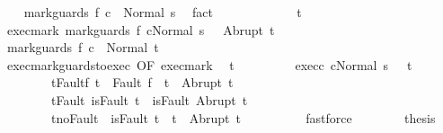 \begin{isabellebody}
\ \ \isamarkupfalse%
\ {\isachardoublequoteopen}{\isasymGamma}{\isasymturnstile}mark{\isacharunderscore}guards\ f\ c{}\ {\isasymdown}\ Normal\ s{\isachardoublequoteclose}\ \isamarkupfalse%
\ fact\isanewline
\ \ \isamarkupfalse%
\ \isanewline
\ \ \isacommand{{\isacharbraceleft}}\isamarkupfalse%
\isanewline
\ \ \ \ \isamarkupfalse%
\ t\isanewline
\ \ \ \ \isamarkupfalse%
\ exec{\isacharunderscore}mark{\isacharcolon}\ {\isachardoublequoteopen}{\isasymGamma}{\isasymturnstile}{\isasymlangle}mark{\isacharunderscore}guards\ f\ c{}{\isacharcomma}Normal\ s\ {\isasymrangle}\ {\isasymRightarrow}\ Abrupt\ t{\isachardoublequoteclose}\isanewline
\ \ \ \ \isamarkupfalse%
\ {\isachardoublequoteopen}{\isasymGamma}{\isasymturnstile}mark{\isacharunderscore}guards\ f\ c{}\ {\isasymdown}\ Normal\ t{\isachardoublequoteclose}\isanewline
\ \ \ \ \isamarkupfalse%
\ {\isacharminus}\isanewline
\ \ \ \ \ \ \isamarkupfalse%
\ exec{\isacharunderscore}mark{\isacharunderscore}guards{\isacharunderscore}to{\isacharunderscore}exec\ {\isacharbrackleft}OF\ exec{\isacharunderscore}mark{\isacharbrackright}\ \isamarkupfalse%
\ t{\isacharprime}\ \isanewline
\ \ \ \ \ \ \ \ exec{\isacharunderscore}c{}{\isacharcolon}\ {\isachardoublequoteopen}{\isasymGamma}{\isasymturnstile}{\isasymlangle}c{}{\isacharcomma}Normal\ s\ {\isasymrangle}\ {\isasymRightarrow}\ t{\isacharprime}{\isachardoublequoteclose}\ \isanewline
\ \ \ \ \ \ \ \ t{\isacharprime}{\isacharunderscore}Fault{\isacharunderscore}f{\isacharcolon}\ {\isachardoublequoteopen}t{\isacharprime}\ {\isacharequal}\ Fault\ f\ {\isasymlongrightarrow}\ t{\isacharprime}\ {\isacharequal}\ Abrupt\ t{\isachardoublequoteclose}\ \isanewline
\ \ \ \ \ \ \ \ t{\isacharprime}{\isacharunderscore}Fault{\isacharcolon}\ {\isachardoublequoteopen}isFault\ t{\isacharprime}\ {\isasymlongrightarrow}\ isFault\ {\isacharparenleft}Abrupt\ t{\isacharparenright}{\isachardoublequoteclose}\ \isanewline
\ \ \ \ \ \ \ \ t{\isacharprime}{\isacharunderscore}noFault{\isacharcolon}\ {\isachardoublequoteopen}{\isasymnot}\ isFault\ t{\isacharprime}\ {\isasymlongrightarrow}\ t{\isacharprime}\ {\isacharequal}\ Abrupt\ t{\isachardoublequoteclose}\isanewline
\ \ \ \ \ \ \ \ \isamarkupfalse%
\ fastforce\isanewline
\ \ \ \ \ \ \isamarkupfalse%
\ {\isacharquery}thesis\isanewline
\ \ \ \ \ \ \isamarkupfalse%

\end{isabellebody}
